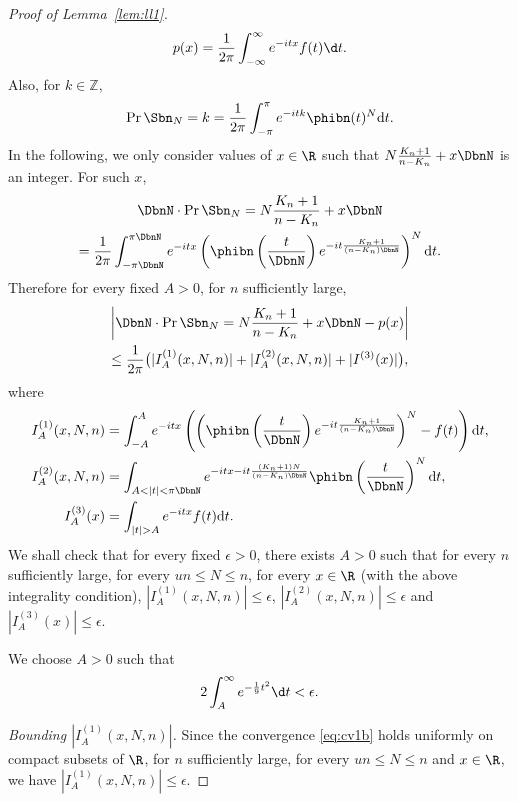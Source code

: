 \begin{proof}[Proof of Lemma~\ref{lem:ll1}]
\begin{equation}
 \label{eq:fourierb}  p(x)= \frac{1}{2\pi} \int_{-\infty}^{\infty} e^{-itx} f(t) {\d}t.
 \end{equation}
Also, for $k \in \mathbb{Z}$,
\[ \Pr{\Sbn_{N}=k} = \frac{1}{2\pi} \int_{-\pi}^{\pi} e^{-itk} \phibn(t)^{ N} {\mathrm{d}}t.\]
In the following, we only consider values of $x \in \R$ such that $N \frac{K_{n}+1}{n-K_{n}}+x  \DbnN$ is an integer.
For such $x$,
\begin{multline*}
  \DbnN \cdot \Pr{\Sbn_{ N}= N \frac{K_{n}+1}{n-K_{n}}+x  \DbnN}\\
  =  \frac{1}{2\pi} \int^{\pi \DbnN}_{-\pi \DbnN} e^{- i t x} \left(  \phibn \left(  \frac{t}{\DbnN} \right)   e^{-it \frac{K_{n}+1}{(n-K_{n}) \DbnN}} \right)^{N} {\mathrm{d}}t.
\end{multline*}
Therefore for every fixed $A>0$, for $n$ sufficiently large,
\begin{multline*}
  \left| \DbnN \cdot \Pr{\Sbn_{N}= N \frac{K_{n}+1}{n-K_{n}}+x  \DbnN} -p( x)\right| \\
  \leq \frac{1}{2 \pi} \big(|I^{(1)}_{A}(x,N,n)| + |I^{(2)}_{A}(x,N,n)|+|I^{(3)}(x)|\big),
\end{multline*}
where
\begin{align*}
  I^{(1)}_{A}(x,N,n)&=\int_{-A}^{A} e^{-i t x} \left(   \left(  \phibn \left(  \frac{t}{\DbnN} \right)   e^{-it \frac{K_{n}+1}{(n-K_{n}) \DbnN}} \right)^{N}- f(t) \right) {\mathrm{d}}t,\\
 I^{(2)}_{A}(x,N,n)&= \int_{A<|t|< \pi \DbnN} e^{-itx - it \frac{(K_{n}+1) N}{(n-K_{n}) \DbnN}} \phibn \left(  \frac{t}{\DbnN} \right) ^{ N}{\mathrm{d}}t, \\
 I^{(3)}_{A}(x)&= \int_{|t|>A} e^{-itx} f(t) {\mathrm{d}}t.
 \end{align*}
We shall check that for every fixed $\epsilon>0$, there exists $A>0$ such that for every $n$ sufficiently large, for every $ un \leq N \leq  n$, for every $x \in \R$ (with the above integrality condition),  $|I^{(1)}_{A}(x,N,n)| \leq \epsilon$, $|I^{(2)}_{A}(x,N,n)| \leq \epsilon$ and $|I^{(3)}_{A}(x)| \leq\epsilon$.



 We choose $A >0$ such that
\begin{equation}
\label{eq:Ab} 2 \int_{A}^{\infty } e^{-  \frac{1}{9} t^{2}} {\d}t < \epsilon.
\end{equation}


\emph{Bounding $|I^{(1)}_{A}(x,N,n)|$.} Since the convergence \eqref{eq:cv1b} holds  uniformly on compact subsets of $\R$, for   $n$ sufficiently large, for every $ un \leq N \leq n$ and $x \in \R$, we have $|I^{(1)}_{A}(x,N,n)| \leq \epsilon$.


\end{proof}
